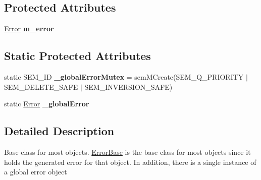 \subsection*{Protected Attributes}
\begin{DoxyCompactItemize}
\item 
\hypertarget{classErrorBase_a4996df94b6e5fc5375e9c33ff5386374}{
\hyperlink{classError}{Error} {\bfseries m\_\-error}}
\label{classErrorBase_a4996df94b6e5fc5375e9c33ff5386374}

\end{DoxyCompactItemize}
\subsection*{Static Protected Attributes}
\begin{DoxyCompactItemize}
\item 
\hypertarget{classErrorBase_ae473c401d7462d6a353ab3c904d570b8}{
static SEM\_\-ID {\bfseries \_\-globalErrorMutex} = semMCreate(SEM\_\-Q\_\-PRIORITY $|$ SEM\_\-DELETE\_\-SAFE $|$ SEM\_\-INVERSION\_\-SAFE)}
\label{classErrorBase_ae473c401d7462d6a353ab3c904d570b8}

\item 
\hypertarget{classErrorBase_a5e60c928a7eb8e94b243aa6a729bf6f6}{
static \hyperlink{classError}{Error} {\bfseries \_\-globalError}}
\label{classErrorBase_a5e60c928a7eb8e94b243aa6a729bf6f6}

\end{DoxyCompactItemize}


\subsection{Detailed Description}
Base class for most objects. \hyperlink{classErrorBase}{ErrorBase} is the base class for most objects since it holds the generated error for that object. In addition, there is a single instance of a global error object 

